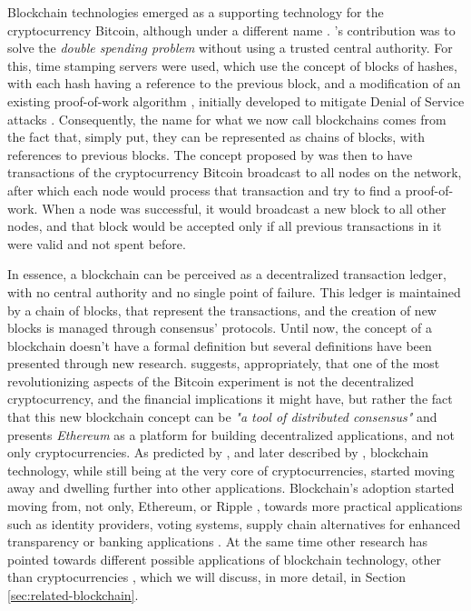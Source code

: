 Blockchain technologies emerged as a supporting technology for the cryptocurrency Bitcoin, although under a different name \cite{nakamoto_bitcoin:_2008}. \citeauthor{nakamoto_bitcoin:_2008}'s contribution was to solve the \textit{double spending problem} without using a trusted central authority. For this, time stamping servers were used, which use the concept of blocks of hashes, with each hash having a reference to the previous block, and a modification of an existing proof-of-work algorithm \cite{back_hashcash_2002}, initially developed to mitigate Denial of Service attacks \cite[1]{back_hashcash_2002}. Consequently, the name for what we now call blockchains comes from the fact that, simply put, they can be represented as chains of blocks, with references to previous blocks. The concept proposed by \citeauthor{nakamoto_bitcoin:_2008} \cite{nakamoto_bitcoin:_2008} was then to have transactions of the cryptocurrency Bitcoin broadcast to all nodes on the network, after which each node would process that transaction and try to find a proof-of-work. When a node was successful, it would broadcast a new block to all other nodes, and that block would be accepted only if all previous transactions in it were valid and not spent before.

In essence, a blockchain can be perceived as a decentralized transaction ledger, with no central authority and no single point of failure. This ledger is maintained by a chain of blocks, that represent the transactions, and the creation of new blocks is managed through consensus' protocols. Until now, the concept of a blockchain doesn't have a formal definition but several definitions have been presented through new research. \citeauthor{buterin_next-generation_2013} \cite{buterin_next-generation_2013} suggests, appropriately, that one of the most revolutionizing aspects of the Bitcoin experiment is not the decentralized cryptocurrency, and the financial implications it might have, but rather the fact that this new blockchain concept can be \textit{"a tool of distributed consensus"} \cite{buterin_next-generation_2013} and presents \textit{Ethereum} as a platform for building decentralized applications, and not only cryptocurrencies. As predicted by \citeauthor{buterin_next-generation_2013} \cite{buterin_next-generation_2013}, and later described by \citeauthor{pilkington_blockchain_2016} \cite{pilkington_blockchain_2016}, blockchain technology, while still being at the very core of cryptocurrencies, started moving away and dwelling further into other applications. Blockchain's adoption started moving from, not only, Ethereum, or Ripple \cite{schwartz_ripple_2014}, towards more practical applications such as identity providers, voting systems, supply chain alternatives for enhanced transparency or banking applications \cite{pilkington_blockchain_2016}. At the same time other research has pointed towards different possible applications of blockchain technology, other than cryptocurrencies \cite{crosby_blockchain_2016, underwood_blockchain_2016, yermack_corporate_2017, xu_blockchain_2016}, which we will discuss, in more detail, in Section \ref{sec:related-blockchain}.

